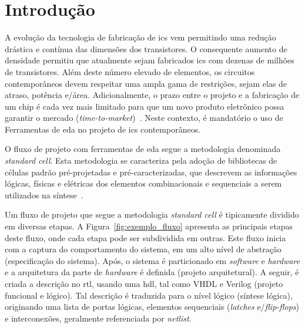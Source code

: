 \chapter{Introdução}
\label{cap:introducao}

A evolução da tecnologia de fabricação de \acp{ic} vem permitindo uma redução drástica e contínua das dimensões dos transistores.
O consequente aumento de densidade permitiu que atualmente sejam fabricados \acp{ic} com dezenas de milhões de transistores.
Além deste número elevado de elementos, os circuitos contemporâneos devem respeitar uma ampla gama de restrições, sejam elas de atraso, potência e\@/\@ou área.
Adicionalmente, o prazo entre o projeto e a fabricação de um chip é cada vez mais limitado para que um novo produto eletrônico possa garantir o mercado (\textit{time-to-market})~\cite{papa2011physical}.
Neste contexto, é mandatório o uso de Ferramentas de \ac{eda} no projeto de \acp{ic} contemporâneos.

O fluxo de projeto com ferramentas de \ac{eda} segue a metodologia denominada \textit{standard cell}.
Esta metodologia se caracteriza pela adoção de bibliotecas de células padrão pré-projetadas e pré-caracterizadas, que descrevem as informações lógicas, físicas e elétricas dos elementos combinacionais e sequenciais a serem utilizados na síntese~\cite{kahng2011vlsi}.

Um fluxo de projeto que segue a metodologia \textit{standard cell} é tipicamente dividido em diversas etapas.
A Figura~\ref{fig:exemplo_fluxo} apresenta as principais etapas deste fluxo, onde cada etapa pode ser subdividida em outras.
Este fluxo inicia com a captura do comportamento do sistema, em um alto nível de abstração (especificação do sistema).
Após, o sistema é particionado em \textit{software} e \textit{hardware} e a arquitetura da parte de \textit{hardware} é definida (projeto arquitetural).
A seguir, é criada a descrição no \ac{rtl}, usando uma \ac{hdl}, tal como VHDL e Verilog (projeto funcional e lógico).
Tal descrição é traduzida para o nível lógico (síntese lógica), originando uma lista de portas lógicas, elementos sequenciais (\textit{latches} e\@/\@ou \textit{flip-flops}) e interconexões, geralmente referenciada por \textit{netlist}.

